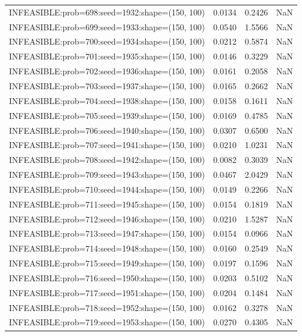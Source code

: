 \begin{longtable}{lccc}
INFEASIBLE:prob=698:seed=1932:shape=(150, 100) &   0.0134 &  0.2426 &    NaN \\
INFEASIBLE:prob=699:seed=1933:shape=(150, 100) &   0.0540 &  1.5566 &    NaN \\
INFEASIBLE:prob=700:seed=1934:shape=(150, 100) &   0.0212 &  0.5874 &    NaN \\
INFEASIBLE:prob=701:seed=1935:shape=(150, 100) &   0.0146 &  0.3229 &    NaN \\
INFEASIBLE:prob=702:seed=1936:shape=(150, 100) &   0.0161 &  0.2058 &    NaN \\
INFEASIBLE:prob=703:seed=1937:shape=(150, 100) &   0.0165 &  0.2662 &    NaN \\
INFEASIBLE:prob=704:seed=1938:shape=(150, 100) &   0.0158 &  0.1611 &    NaN \\
INFEASIBLE:prob=705:seed=1939:shape=(150, 100) &   0.0169 &  0.4785 &    NaN \\
INFEASIBLE:prob=706:seed=1940:shape=(150, 100) &   0.0307 &  0.6500 &    NaN \\
INFEASIBLE:prob=707:seed=1941:shape=(150, 100) &   0.0210 &  1.0231 &    NaN \\
INFEASIBLE:prob=708:seed=1942:shape=(150, 100) &   0.0082 &  0.3039 &    NaN \\
INFEASIBLE:prob=709:seed=1943:shape=(150, 100) &   0.0467 &  2.0429 &    NaN \\
INFEASIBLE:prob=710:seed=1944:shape=(150, 100) &   0.0149 &  0.2266 &    NaN \\
INFEASIBLE:prob=711:seed=1945:shape=(150, 100) &   0.0154 &  0.1819 &    NaN \\
INFEASIBLE:prob=712:seed=1946:shape=(150, 100) &   0.0210 &  1.5287 &    NaN \\
INFEASIBLE:prob=713:seed=1947:shape=(150, 100) &   0.0154 &  0.0966 &    NaN \\
INFEASIBLE:prob=714:seed=1948:shape=(150, 100) &   0.0160 &  0.2549 &    NaN \\
INFEASIBLE:prob=715:seed=1949:shape=(150, 100) &   0.0197 &  0.1596 &    NaN \\
INFEASIBLE:prob=716:seed=1950:shape=(150, 100) &   0.0203 &  0.5102 &    NaN \\
INFEASIBLE:prob=717:seed=1951:shape=(150, 100) &   0.0204 &  0.1484 &    NaN \\
INFEASIBLE:prob=718:seed=1952:shape=(150, 100) &   0.0162 &  0.3278 &    NaN \\
INFEASIBLE:prob=719:seed=1953:shape=(150, 100) &   0.0270 &  0.4305 &    NaN \\

\end{longtable}
